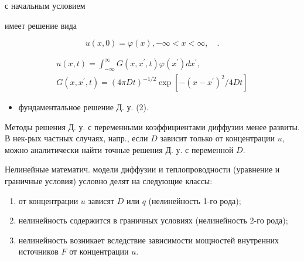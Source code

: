 \documentclass[10pt]{article}
\begin{document}
с начальным условием



имеет решение вида



\[

u(x, 0)=\varphi(x),-\infty<x<\infty, \quad .

\]



\[

\begin{gathered}

u(x, t)=\int_{-\infty}^{\infty} G\left(x, x^{\prime}, t\right) \varphi\left(x^{\prime}\right) d x^{\prime}, \\

G\left(x, x^{\prime}, t\right)=(4 \pi D t)^{-1 / 2} \exp \left[-\left(x-x^{\prime}\right)^{2} / 4 D t\right]

\end{gathered}

\]



\begin{itemize}

  \item фундаментальное решение Д. у. (2).

\end{itemize}



Методы решения Д. у. с переменными коэффициентами диффузии менее развиты. В нек-рых частных случаях, напр., если $D$ зависит только от концентрации $u$, можно аналитически найти точные решения Д. у. с переменной $D$.



Нелинейные математич. модели диффузии и теплопроводности (уравнение и граничные условия) условно делят на следующие классы:



\begin{enumerate}

  \item от концентрации $u$ зависят $D$ или $q$ (нелинейность 1-го рода);



  \item нелинейность содержится в граничных условиях (нелинейность 2-го рода);



  \item нелинейность возникает вследствие зависимости мощностей внутренних источников $F$ от концентрации $u$.



\end{enumerate}
\end{document}
